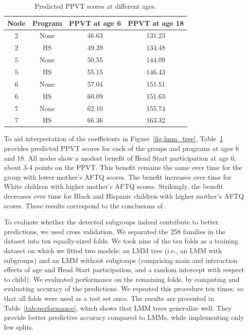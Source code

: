 \documentclass[doc,floatsintext,natbib]{apa7}
\begin{document}
\begin{table}

\caption{\label{tab:predictions}Predicted PPVT scores at different ages.}
\begin{tabular}[t]{cccc}
\toprule
Node & Program & PPVT at age 6 & PPVT at age 18\\
\midrule
2 & None & 46.63 & 131.23\\
2 & HS & 49.39 & 134.48\\
5 & None & 50.55 & 144.09\\
5 & HS & 55.15 & 146.43\\
6 & None & 57.04 & 151.51\\
6 & HS & 60.09 & 151.63\\
7 & None & 62.10 & 155.74\\
7 & HS & 66.36 & 163.32\\
\bottomrule
\end{tabular}
\end{table}
To aid interpretation of the coefficients in Figure~\ref{fig:lmm_tree}, Table~\ref{tab:predictions} provides predicted PPVT scores for each of the groups and programs at ages 6 and 18. All nodes show a modest benefit of Head Start participation at age 6, about 3-4 points on the PPVT. This benefit remains the same over time for the group with lower mother's AFTQ scores. The benefit increases over time for White children with higher mother's AFTQ scores. Strikingly, the benefit decreases over time for Black and Hispanic children with higher mother's AFTQ scores. These results correspond to the conclusions of \cite{Demi09}. 

To evaluate whether the detected subgroups indeed contribute to better predictions, we used cross validation. We separated the 258 families in the dataset into ten equally-sized folds. We took nine of the ten folds as a training dataset on which we fitted two models: an LMM tree (i.e., an LMM with subgroups) and an LMM without subgroups (comprising main and interaction effects of age and Head Start participation, and a random intercept with respect to child). We evaluated performance on the remaining folds, by computing and evaluating accuracy of the predictions.  We repeated this procedure ten times, so that all folds were used as a test set once. The results are presented in Table~\ref{tab:performance}, which shows that LMM trees generalize well: They provide better predictive accuracy compared to LMMs, while implementing only few splits. 
\end{document}
